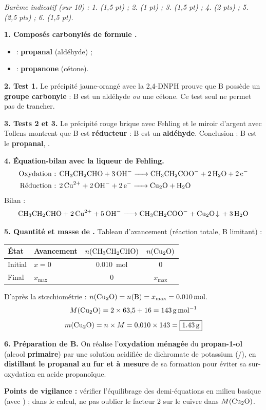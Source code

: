 \documentclass[11pt]{article}
\begin{document}
\begin{corrige}
\emph{Barème indicatif (sur 10) : 1. (1,5 pt) ; 2. (1 pt) ; 3. (1,5 pt) ; 4. (2 pts) ; 5. (2,5 pts) ; 6. (1,5 pt).}

\textbf{1. Composés carbonylés de formule .}
\begin{itemize}
\item {} : \textbf{propanal} (aldéhyde) ;
\item {} : \textbf{propanone} (cétone).
\end{itemize}

\textbf{2. Test 1.} Le précipité jaune-orangé avec la 2,4-DNPH prouve que B possède un \textbf{groupe carbonyle} : B est un aldéhyde \emph{ou} une cétone. Ce test seul ne permet pas de trancher.

\textbf{3. Tests 2 et 3.} Le précipité rouge brique avec Fehling et le miroir d'argent avec Tollens montrent que B est \textbf{réducteur} : B est un \textbf{aldéhyde}. Conclusion : B est le \textbf{propanal}, .

\textbf{4. Équation-bilan avec la liqueur de Fehling.}
\begin{align*}
\text{Oxydation : } & \ce{CH3CH2CHO + 3 OH- -> CH3CH2COO- + 2 H2O + 2 e-} \\
\text{Réduction : } & \ce{2 Cu^2+ + 2 OH- + 2 e- -> Cu2O + H2O}
\end{align*}
Bilan :
\[ \ce{CH3CH2CHO + 2 Cu^2+ + 5 OH- -> CH3CH2COO- + Cu2O v + 3 H2O} \]

\textbf{5. Quantité et masse de .} Tableau d'avancement (réaction totale, B limitant) :
\begin{center}
\begin{tabularx}{\linewidth}{|l|X|c|c|}
\hline
\rowcolor{popblueL} \textbf{État} & \textbf{Avancement} & $n(\ce{CH3CH2CHO})$ & $n(\ce{Cu2O})$ \\
\hline
Initial & $x=0$ & \SI{0,010}{mol} & $0$ \\
\hline
Final & $x_{\max}$ & $0$ & $x_{\max}$ \\
\hline
\end{tabularx}
\end{center}
D'après la stœchiométrie : $n(\ce{Cu2O}) = n(\ce{B}) = x_{\max} = \SI{0,010}{mol}$.
\[ M(\ce{Cu2O}) = 2 \times 63{,}5 + 16 = \SI{143}{g.mol^{-1}} \]
\[ m(\ce{Cu2O}) = n \times M = 0{,}010 \times 143 = \boxed{\SI{1,43}{g}} \]

\textbf{6. Préparation de B.} On réalise l'\textbf{oxydation ménagée} du \textbf{propan-1-ol}  (alcool \textbf{primaire}) par une solution acidifiée de dichromate de potassium (/), en \textbf{distillant le propanal au fur et à mesure} de sa formation pour éviter sa sur-oxydation en acide propanoïque.

\textbf{Points de vigilance :} vérifier l'équilibrage des demi-équations en milieu basique (avec ) ; dans le calcul, ne pas oublier le facteur 2 sur le cuivre dans $M(\ce{Cu2O})$.
\end{corrige}
\end{document}

